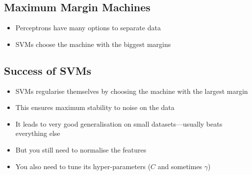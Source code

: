 \begin{slide}
  \section[-2]{Maximum Margin Machines}
  \pb
  \begin{itemize}
  \item Perceptrons have many options to separate data\pauseh
    \begin{center}
      \pause
    \end{center}
  \item SVMs choose the machine with the biggest margins\pause
  \end{itemize}
\end{slide}


\begin{slide}
\section{Success of SVMs}

\begin{PauseHighLight}
  \begin{itemize}
  \item SVMs regularise themselves by choosing the machine with the
    largest margin\pause
  \item This ensures maximum stability to noise on the data\pause
  \item It leads to very good generalisation on small
    datasets\pause---usually beats everything else\pause
  \item But you still need to normalise the features\pauseb
  \item You also need to tune its hyper-parameters ($C$ and sometimes
    $\gamma$)\pauseb
  \end{itemize}
\end{PauseHighLight}

\end{slide}



